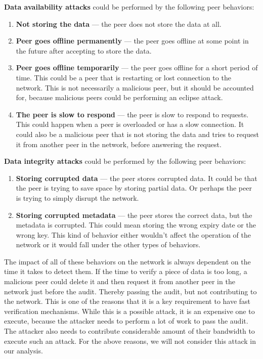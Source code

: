 \textbf{Data availability attacks} could be performed by the following peer behaviors:
\begin{enumerate}
    \item \textbf{Not storing the data} --- the peer does not store the data at all.
    \item \textbf{Peer goes offline permanently} --- the peer goes offline at some point in the future after accepting to store the data.
    \item \textbf{Peer goes offline temporarily} --- the peer goes offline for a short period of time.
        This could be a peer that is restarting or lost connection to the network.
        This is not necessarily a malicious peer, but it should be accounted for,
        because malicious peers could be performing an eclipse attack.
    \item \textbf{The peer is slow to respond} --- the peer is slow to respond to requests.
        This could happen when a peer is overloaded or has a slow connection.
        It could also be a malicious peer that is not storing the data and tries to request it
        from another peer in the network, before answering the request.
\end{enumerate}

\textbf{Data integrity attacks} could be performed by the following peer behaviors:
\begin{enumerate}
    \item \textbf{Storing corrupted data} --- the peer stores corrupted data.
        It could be that the peer is trying to save space by storing partial data.
        Or perhaps the peer is trying to simply disrupt the network.
    \item \textbf{Storing corrupted metadata} --- the peer stores the correct data, but the metadata is corrupted.
        This could mean storing the wrong expiry date or the wrong key.
        This kind of behavior either wouldn't affect the operation of the network or it would fall
        under the other types of behaviors.
\end{enumerate}

The impact of all of these behaviors on the network is always dependent on the time it takes to detect them.
If the time to verify a piece of data is too long, a malicious peer could delete it and then
request it from another peer in the network just before the audit.
Thereby passing the audit, but not contributing to the network.
This is one of the reasons that it is a key requirement to have fast verification mechanisms.
While this is a possible attack, it is an expensive one to execute,
because the attacker needs to perform a lot of work to pass the audit.
The attacker also needs to contribute considerable amount of their bandwidth to execute such an attack.
For the above reasons, we will not consider this attack in our analysis.

